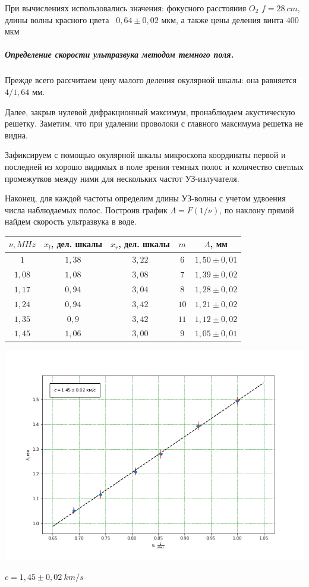 \documentclass[12pt]{article}
\begin{document}
При вычислениях использовались значения: фокусного расстояния $O_2$ $f = 28\ cm$, длины волны красного цвета  $0,64 \pm 0,02$ мкм, а также цены деления винта $400$ мкм
\subparagraph{Определение скорости ультразвука методом темного поля.}

Прежде всего рассчитаем цену малого деления окулярной шкалы: она равняется $4/1,64$ мм.

Далее, закрыв нулевой дифракционный максимум, пронаблюдаем акустическую решетку. Заметим, что при удалении проволоки с главного максимума решетка не видна. 

Зафиксируем с помощью окулярной шкалы микроскопа координаты первой и последней из хорошо видимых в поле зрения темных полос и количество светлых промежутков между ними для нескольких частот УЗ-излучателя.

Наконец, для каждой частоты определим длины УЗ-волны с учетом удвоения числа наблюдаемых полос. Построив график $\Lambda = F(1/\nu)$, по наклону прямой найдем скорость ультразвука в воде.

\begin{center}
	
\begin{tabular}{|c|c|c|c|c|}
	\hline 
	$\nu, MHz$ & $x_l$, дел. шкалы & $x_r$, дел. шкалы & $m$ & $\Lambda$, мм \\ 
	\hline 
	\hline
	$1$& $1,38$  & $3,22$  & $6$ & $1,50 \pm 0,01$ \\
	\hline 
	$1,08$ & $1,08$ & $3,08$ & $7$ & $1,39 \pm 0,02$\\
	\hline
	$1,17$ & $0,94$ & $3,04$ & $8$ & $1,28 \pm 0,02$\\
	\hline
	$1,24$ & $0,94$ & $3,42$ & $10$ & $1,21 \pm 0,02$\\
	\hline
	$1,35$ & $0,9$ & $3,42$ & $11$ & $1,12 \pm 0,02$\\
	\hline
	$1,45$ & $1,06$ & $3,00$ & $9$ & $1,05 \pm 0,01$\\
	\hline 
\end{tabular} 

\includegraphics[scale=.6]{speed_by_dark_field}

$\boxed{c = 1,45 \pm 0,02\ km/s}$
\end{center}
\end{document}
